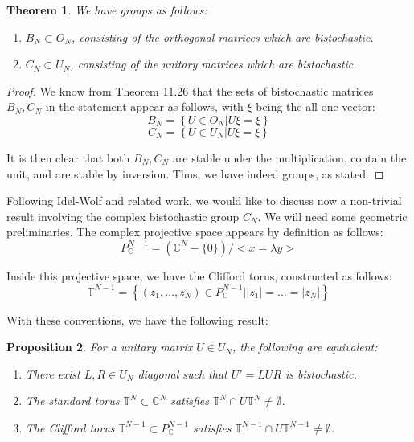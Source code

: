 \documentclass[12pt]{amsbook}
\newtheorem{theorem}{Theorem}[chapter]
\newtheorem{proposition}[theorem]{Proposition}
\begin{document}

\begin{theorem}
We have groups as follows:
\begin{enumerate}
\item $B_N\subset O_N$, consisting of the orthogonal matrices which are bistochastic.

\item $C_N\subset U_N$, consisting of the unitary matrices which are bistochastic.
\end{enumerate}
\end{theorem}

\begin{proof}
We know from Theorem 11.26 that the sets of bistochastic matrices $B_N,C_N$ in the statement appear as follows, with $\xi$ being the all-one vector:
$$B_N=\left\{U\in O_N\Big|U\xi=\xi\right\}$$
$$C_N=\left\{U\in U_N\Big|U\xi=\xi\right\}$$

It is then clear that both $B_N,C_N$ are stable under the multiplication, contain the unit, and are stable by inversion. Thus, we have indeed groups, as stated.
\end{proof}

Following Idel-Wolf and related work, we would like to discuss now a non-trivial result involving the complex bistochastic group $C_N$. We will need some geometric preliminaries. The complex projective space appears by definition as follows:
$$P^{N-1}_\mathbb C=(\mathbb C^N-\{0\})\big/<x=\lambda y>$$

Inside this projective space, we have the Clifford torus, constructed as follows:
$$\mathbb T^{N-1}=\left\{(z_1,\ldots,z_N)\in P^{N-1}_\mathbb C\Big||z_1|=\ldots=|z_N|\right\}$$

With these conventions, we have the following result:


\begin{proposition}
For a unitary matrix $U\in U_N$, the following are equivalent:
\begin{enumerate}
\item There exist $L,R\in U_N$ diagonal such that $U'=LUR$ is bistochastic.

\item The standard torus $\mathbb T^N\subset\mathbb C^N$ satisfies $\mathbb T^N\cap U\mathbb T^N\neq\emptyset$.

\item The Clifford torus $\mathbb T^{N-1}\subset P^{N-1}_\mathbb C$ satisfies $\mathbb T^{N-1}\cap U\mathbb T^{N-1}\neq\emptyset$.
\end{enumerate}
\end{proposition}
\end{document}
